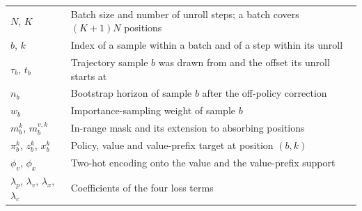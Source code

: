 
\begin{tabular}{p{2.5cm} p{11cm}}
$N$, $K$ & Batch size and number of unroll steps; a batch covers $(K+1)N$ positions \\
$b$, $k$ & Index of a sample within a batch and of a step within its unroll \\
$\tau_b$, $t_b$ & Trajectory sample $b$ was drawn from and the offset its unroll starts at \\
$n_b$ & Bootstrap horizon of sample $b$ after the off-policy correction \\
$w_b$ & Importance-sampling weight of sample $b$ \\
$m^k_b$, $m^{v,k}_b$ & In-range mask and its extension to absorbing positions \\
$\pi^k_b$, $z^k_b$, $x^k_b$ & Policy, value and value-prefix target at position $(b,k)$ \\
$\phi_v$, $\phi_x$ & Two-hot encoding onto the value and the value-prefix support \\
$\lambda_p$, $\lambda_v$, $\lambda_x$, $\lambda_c$ & Coefficients of the four loss terms \\
\end{tabular}
